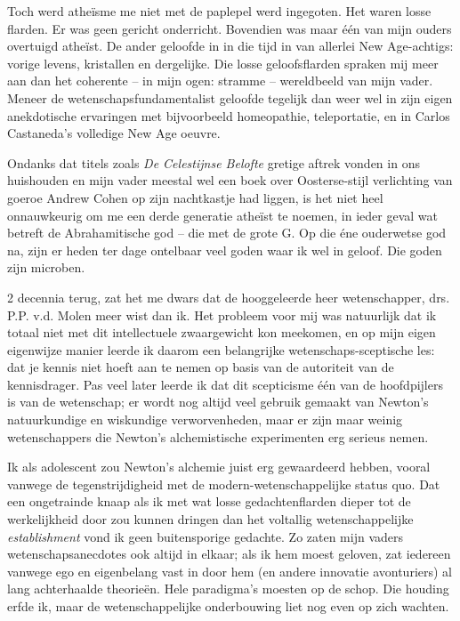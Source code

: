 \documentclass[12pt,a4paper]{article}
\begin{document}
Toch werd atheïsme me niet met de paplepel werd ingegoten. Het waren losse flarden. Er was geen gericht onderricht. Bovendien was maar één van mijn ouders overtuigd atheïst. De ander geloofde in in die tijd in van allerlei New Age-achtigs: vorige levens, kristallen en dergelijke. Die losse geloofsflarden spraken mij meer aan dan het coherente – in mijn ogen: stramme – wereldbeeld van mijn vader. Meneer de wetenschapsfundamentalist geloofde tegelijk dan weer wel in zijn eigen anekdotische ervaringen met bijvoorbeeld homeopathie, teleportatie, en in Carlos Castaneda's volledige New Age oeuvre.

Ondanks dat titels zoals \emph{De Celestijnse Belofte} gretige aftrek vonden in ons huishouden en mijn vader meestal wel een boek over Oosterse-stijl verlichting van goeroe Andrew Cohen op zijn nachtkastje had liggen, is het niet heel onnauwkeurig om me een derde generatie atheïst te noemen, in ieder geval wat betreft de Abrahamitische god – die met de grote G. Op die éne ouderwetse god na, zijn er heden ter dage ontelbaar veel goden waar ik wel in geloof. Die goden zijn microben.

2 decennia terug, zat het me dwars dat de hooggeleerde heer wetenschapper, drs. P.P. v.d. Molen meer wist dan ik. Het probleem voor mij was natuurlijk dat ik totaal niet met dit intellectuele zwaargewicht kon meekomen, en op mijn eigen eigenwijze manier leerde ik daarom een belangrijke wetenschaps-sceptische les: dat je kennis niet hoeft aan te nemen op basis van de autoriteit van de kennisdrager. Pas veel later leerde ik dat dit scepticisme één van de hoofdpijlers is van de wetenschap; er wordt nog altijd veel gebruik gemaakt van Newton's natuurkundige en wiskundige verworvenheden, maar er zijn maar weinig wetenschappers die Newton's alchemistische experimenten erg serieus nemen.

Ik als adolescent zou Newton's alchemie juist erg gewaardeerd hebben, vooral vanwege de tegenstrijdigheid met de modern-wetenschappelijke status quo. Dat een ongetrainde knaap als ik met wat losse gedachtenflarden dieper tot de werke\-lijk\-heid door zou kunnen dringen dan het voltallig wetenschappelijke \emph{establishment} vond ik geen buitensporige gedachte. Zo zaten mijn vaders wetenschapsanecdotes ook altijd in elkaar; als ik hem moest geloven, zat iedereen vanwege ego en eigenbelang vast in door hem (en andere innovatie avonturiers) al lang achterhaalde theorieën. Hele paradigma's moesten op de schop. Die houding erfde ik, maar de wetenschappelijke onderbouwing liet nog even op zich wachten.
\end{document}
